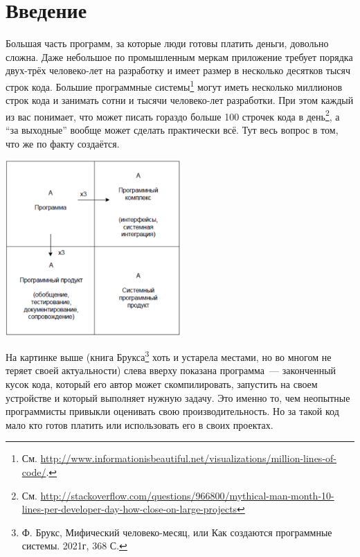 \documentclass{../../text-style}
\begin{document}
\maketitle
\thispagestyle{empty}


\section{Введение}

Большая часть программ, за которые люди готовы платить деньги, довольно сложна. Даже небольшое по промышленным меркам приложение требует порядка двух-трёх человеко-лет на разработку и имеет размер в несколько десятков тысяч строк кода. Большие программные системы\footnote{См. \url{http://www.informationisbeautiful.net/visualizations/million-lines-of-code/}.} могут иметь несколько миллионов строк кода и занимать сотни и тысячи человеко-лет разработки. При этом каждый из вас понимает, что может писать гораздо больше 100 строчек кода в день\footnote{См. \url{http://stackoverflow.com/questions/966800/mythical-man-month-10-lines-per-developer-day-how-close-on-large-projects}}, а \enquote{за выходные} вообще может сделать практически всё. Тут весь вопрос в том, что же по факту создаётся.

\begin{center}
    \includegraphics[width=0.5\textwidth]{brooksSquare.png}
\end{center}

На картинке выше (книга Брукса\footnote{Ф. Брукс, Мифический человеко-месяц, или Как создаются программные системы. 2021г, 368 С.} хоть и устарела местами, но во многом не теряет своей актуальности) слева вверху показана программа~--- законченный кусок кода, который его автор может скомпилировать, запустить на своем устройстве и который выполняет нужную задачу. Это именно то, чем неопытные программисты привыкли оценивать свою производительность. Но за такой код мало кто готов платить или использовать его в своих проектах.
\end{document}
